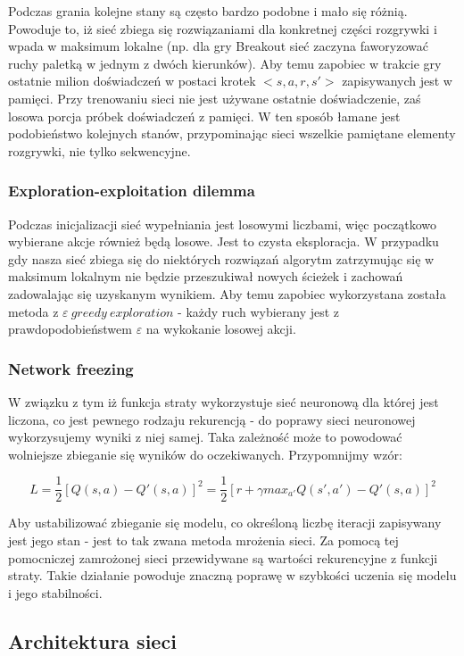 \documentclass[12pt]{article}
\begin{document}
Podczas grania kolejne stany są często bardzo podobne i mało się różnią. Powoduje to, iż sieć zbiega się rozwiązaniami dla konkretnej części rozgrywki i wpada w maksimum lokalne (np. dla gry Breakout sieć zaczyna faworyzować ruchy paletką w jednym z dwóch kierunków). Aby temu zapobiec w trakcie gry ostatnie milion doświadczeń w postaci krotek $<s, a, r, s'>$ zapisywanych jest w pamięci. Przy trenowaniu sieci nie jest używane ostatnie doświadczenie, zaś losowa porcja próbek doświadczeń z pamięci. W ten sposób łamane jest podobieństwo kolejnych stanów, przypominając sieci wszelkie pamiętane elementy rozgrywki, nie tylko sekwencyjne.

\subsubsection{Exploration-exploitation dilemma}

Podczas inicjalizacji sieć wypełniania jest losowymi liczbami, więc początkowo wybierane akcje również będą losowe. Jest to czysta eksploracja. W przypadku gdy nasza sieć zbiega się do niektórych rozwiązań algorytm zatrzymując się w maksimum lokalnym nie będzie przeszukiwał nowych ścieżek i zachowań zadowalając się uzyskanym wynikiem. Aby temu zapobiec wykorzystana została metoda z $\varepsilon\ greedy\ exploration$ - każdy ruch wybierany jest z prawdopodobieństwem $\varepsilon$ na wykokanie losowej akcji.

\subsubsection{Network freezing}

W związku z tym iż funkcja straty wykorzystuje sieć neuronową dla której jest liczona, co jest pewnego rodzaju rekurencją - do poprawy sieci neuronowej wykorzysujemy wyniki z niej samej. Taka zależność może to powodować wolniejsze zbieganie się wyników do oczekiwanych. Przypomnijmy wzór: 

$$L=\frac{1}{2}[Q(s,a)-Q'(s,a)]^2=\frac{1}{2}[r+\gamma max_{a'}Q(s',a')-Q'(s,a)]^2$$

Aby ustabilizować zbieganie się modelu, co określoną liczbę iteracji zapisywany jest jego stan - jest to tak zwana metoda mrożenia sieci. Za pomocą tej pomocniczej zamrożonej sieci przewidywane są wartości rekurencyjne z funkcji straty. Takie działanie powoduje znaczną poprawę w szybkości uczenia się modelu i jego stabilności.

\subsection{Architektura sieci \cite{deepmind_2}}
\end{document}
